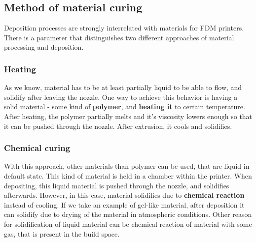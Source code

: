 \documentclass[a4paper, twoside, 11pt]{report}
\begin{document}
\subsection{Method of material curing}
Deposition processes are strongly interrelated with materials for FDM printers. There is a parameter that distinguishes two different approaches of material processing and deposition.
\subsubsection{Heating}
As we know, material has to be at least partially liquid to be able to flow, and solidify after leaving the nozzle. One way to achieve this behavior is having a solid material - some kind of \textbf{polymer}, and \textbf{heating it} to certain temperature. After heating, the polymer partially melts and it's viscosity lowers enough so that it can be pushed through the nozzle. After extrusion, it cools and solidifies.\\
\subsubsection{Chemical curing}
With this approach, other materials than polymer can be used, that are liquid in default state. This kind of material is held in a chamber within the printer. When depositing, this liquid material is pushed through the nozzle, and solidifies afterwards. However, in this case, material solidifies due to \textbf{chemical reaction} instead of cooling. If we take an example of gel-like material, after deposition it can solidify due to drying of the material in atmospheric conditions. Other reason for solidification of liquid material can be chemical reaction of material with some gas, that is present in the build space.\\
\end{document}
